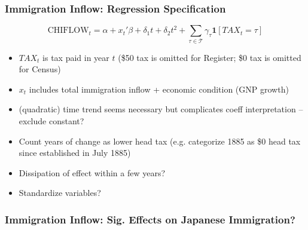 \documentclass[pdf]{beamer}
\begin{document}
\begin{frame}[label = flow_reg]
    \frametitle{Immigration Inflow: Regression Specification}
    \begin{equation*}
        \text{CHIFLOW}_t = \alpha + x_t' \beta + \delta_1 t + \delta_2 t^2 + \sum_{\tau \in \mathcal{T}} \gamma_\tau \mathbf{1}[TAX_t = \tau] 
    \end{equation*}
    \begin{itemize}
        \item $TAX_t$ is tax paid in year $t$ (\$50 tax is omitted for Register; \$0 tax is omitted for Census)
        \item $x_t$ includes total immigration inflow + economic condition (GNP growth)
        \item (quadratic) time trend seems necessary \hyperlink{flow_diff}{} but complicates coeff interpretation -- exclude constant?
        \item Count years of change as lower head tax (e.g. categorize 1885 as \$0 head tax since established in July 1885)
        \item Dissipation of effect within a few years?
        \item Standardize variables?
    \end{itemize}
\end{frame}

\begin{frame}[label = tab2_flow]
    \frametitle{Immigration Inflow: Sig. Effects on Japanese Immigration?}
    \centering
    \begin{table}[H]
		\resizebox{\textwidth}{!}{
            
		}
	\end{table}  
    \hyperlink{census_flow}{}
\end{frame}

\end{document}
